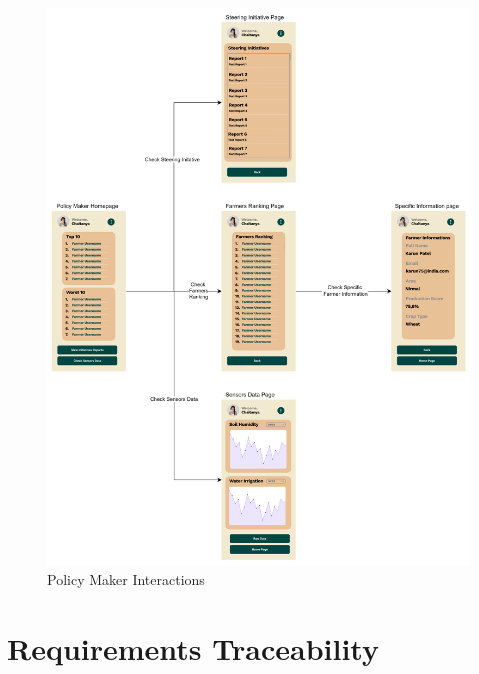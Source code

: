 \documentclass[table, 12pt]{article}
\begin{document}
\begin{center}
    \begin{figure}[H]
        \vspace{-100px}
        \includegraphics[scale=0.7, center]{assets/MockUp/PMInteractoins.png}
        \caption{Policy Maker Interactions}
        \label{fig: PMInter}
    \end{figure}
\end{center}

\section{Requirements Traceability}
\end{document}
